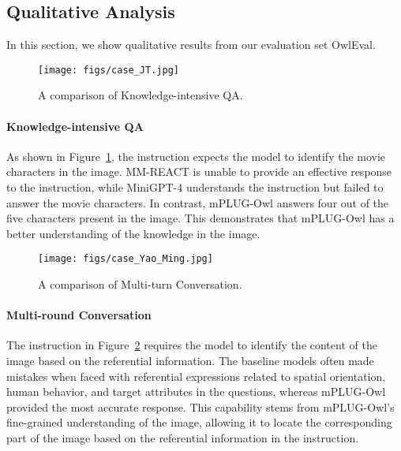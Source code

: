 \documentclass{article}
\newcommand{\modelname}{mPLUG-Owl\xspace}
\newcommand{\evalsetname}{OwlEval\xspace}
\begin{document}
\subsection{Qualitative Analysis}



In this section, we show qualitative results from our evaluation set \evalsetname.

\begin{figure}[!ht]
    \centering
    \texttt{[image: figs/case\_JT.jpg]}
    \caption{A comparison of Knowledge-intensive QA.}
    \label{fig:case_JT}
    \vspace{-2mm}
\end{figure}

\paragraph{Knowledge-intensive QA}
As shown in Figure~\ref{fig:case_JT}, the instruction expects the model to identify the movie characters in the image. MM-REACT is unable to provide an effective response to the instruction, while MiniGPT-4 understands the instruction but failed to answer the movie characters. In contrast, \modelname answers four out of the five characters present in the image. This demonstrates that \modelname has a better understanding of the knowledge in the image.

\begin{figure}[!ht]
    \centering
    \texttt{[image: figs/case\_Yao\_Ming.jpg]}
    \caption{A comparison of Multi-turn Conversation.}
    \label{fig:case_Yao_Ming}
    \vspace{-2mm}
\end{figure}


\paragraph{Multi-round Conversation}
The instruction in Figure~\ref{fig:case_Yao_Ming} requires the model to identify the content of the image based on the referential information. The baseline models often made mistakes when faced with referential expressions related to spatial orientation, human behavior, and target attributes in the questions, whereas \modelname provided the most accurate response. This capability stems from \modelname's fine-grained understanding of the image, allowing it to locate the corresponding part of the image based on the referential information in the instruction.
\end{document}

